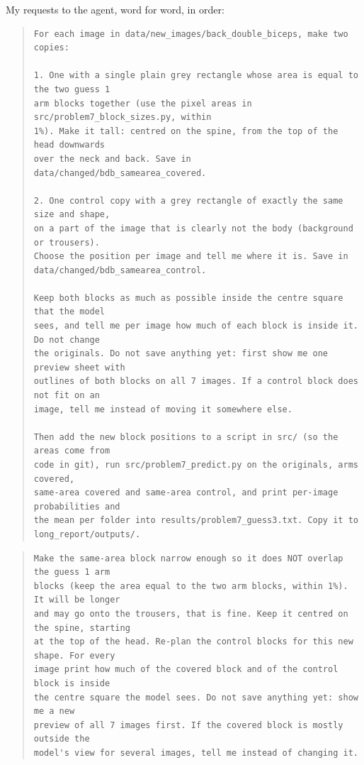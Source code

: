 \documentclass[11pt]{article}
\begin{document}
My requests to the agent, word for word, in order:
\begin{quote}
\begin{Verbatim}[breaklines, fontsize=\small]
For each image in data/new_images/back_double_biceps, make two copies:

1. One with a single plain grey rectangle whose area is equal to the two guess 1
arm blocks together (use the pixel areas in src/problem7_block_sizes.py, within
1%). Make it tall: centred on the spine, from the top of the head downwards
over the neck and back. Save in data/changed/bdb_samearea_covered.

2. One control copy with a grey rectangle of exactly the same size and shape,
on a part of the image that is clearly not the body (background or trousers).
Choose the position per image and tell me where it is. Save in
data/changed/bdb_samearea_control.

Keep both blocks as much as possible inside the centre square that the model
sees, and tell me per image how much of each block is inside it. Do not change
the originals. Do not save anything yet: first show me one preview sheet with
outlines of both blocks on all 7 images. If a control block does not fit on an
image, tell me instead of moving it somewhere else.

Then add the new block positions to a script in src/ (so the areas come from
code in git), run src/problem7_predict.py on the originals, arms covered,
same-area covered and same-area control, and print per-image probabilities and
the mean per folder into results/problem7_guess3.txt. Copy it to
long_report/outputs/.
\end{Verbatim}
\end{quote}
\begin{quote}
\begin{Verbatim}[breaklines, fontsize=\small]
Make the same-area block narrow enough so it does NOT overlap the guess 1 arm
blocks (keep the area equal to the two arm blocks, within 1%). It will be longer
and may go onto the trousers, that is fine. Keep it centred on the spine, starting
at the top of the head. Re-plan the control blocks for this new shape. For every
image print how much of the covered block and of the control block is inside
the centre square the model sees. Do not save anything yet: show me a new
preview of all 7 images first. If the covered block is mostly outside the
model's view for several images, tell me instead of changing it.
\end{Verbatim}
\end{quote}
\end{document}
